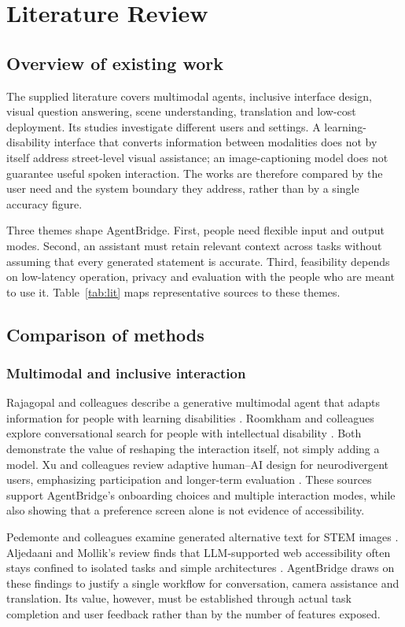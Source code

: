 \documentclass[12pt,a4paper,oneside]{report}
\begin{document}
\chapter{Literature Review}
\section{Overview of existing work}
The supplied literature covers multimodal agents, inclusive interface design, visual question answering, scene understanding, translation and low-cost deployment. Its studies investigate different users and settings. A learning-disability interface that converts information between modalities does not by itself address street-level visual assistance; an image-captioning model does not guarantee useful spoken interaction. The works are therefore compared by the user need and the system boundary they address, rather than by a single accuracy figure.

Three themes shape AgentBridge. First, people need flexible input and output modes. Second, an assistant must retain relevant context across tasks without assuming that every generated statement is accurate. Third, feasibility depends on low-latency operation, privacy and evaluation with the people who are meant to use it. Table~\ref{tab:lit} maps representative sources to these themes.

\section{Comparison of methods}
\subsection{Multimodal and inclusive interaction}
Rajagopal and colleagues describe a generative multimodal agent that adapts information for people with learning disabilities \cite{rajagopal}. Roomkham and colleagues explore conversational search for people with intellectual disability \cite{roomkham}. Both demonstrate the value of reshaping the interaction itself, not simply adding a model. Xu and colleagues review adaptive human--AI design for neurodivergent users, emphasizing participation and longer-term evaluation \cite{xu}. These sources support AgentBridge's onboarding choices and multiple interaction modes, while also showing that a preference screen alone is not evidence of accessibility.

Pedemonte and colleagues examine generated alternative text for STEM images \cite{pedemonte}. Aljedaani and Mollik's review finds that LLM-supported web accessibility often stays confined to isolated tasks and simple architectures \cite{aljedaani}. AgentBridge draws on these findings to justify a single workflow for conversation, camera assistance and translation. Its value, however, must be established through actual task completion and user feedback rather than by the number of features exposed.
\end{document}

